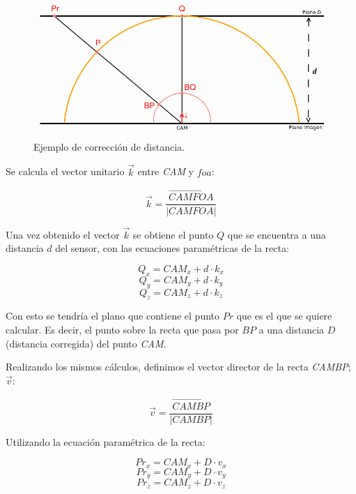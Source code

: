 \begin{figure}[th]
\centering
\includegraphics[scale=0.5]{Figures/calculate-3d.png}
\decoRule
\caption[calculate-3d]{Ejemplo de corrección de distancia.}
\label{fig:calculate3d}
\end{figure}

Se calcula el vector unitario $\vec{k}$ entre \textit{CAM} y $foa$:

\begin{equation}
\vec{k}=\frac{\overrightarrow{CAMFOA}}{|CAMFOA|}
\end{equation}

Una vez obtenido el vector $\vec{k}$ se obtiene el punto $Q$ que se encuentra a una distancia $d$ del sensor, con las ecuaciones paramétricas de la recta:

\begin{equation}
Q_{x}=CAM_{x}+d\cdot k_{x}
\end{equation}
\[ Q_{y}=CAM_{y}+d\cdot k_{y} \]
\[ Q_{z}=CAM_{z}+d\cdot k_{z} \]

Con esto se tendría el plano que contiene el punto $Pr$ que es el que se quiere calcular. Es decir, el punto sobre la recta que pasa por $BP$ a una distancia $D$ (distancia corregida) del punto \textit{CAM}.

Realizando los mismos cálculos, definimos el vector director de la recta \textit{CAMBP}; $\vec{v}$:

\begin{equation}
\vec{v}=\frac{\overrightarrow{CAMBP}}{|CAMBP|}
\end{equation}

Utilizando la ecuación paramétrica de la recta:

\begin{equation}
Pr_{x}=CAM_{x}+D\cdot v_{x}
\label{eqn:param}
\end{equation}
\[ Pr_{y}=CAM_{y}+D\cdot v_{y} \]
\[ Pr_{z}=CAM_{z}+D\cdot v_{z} \]


